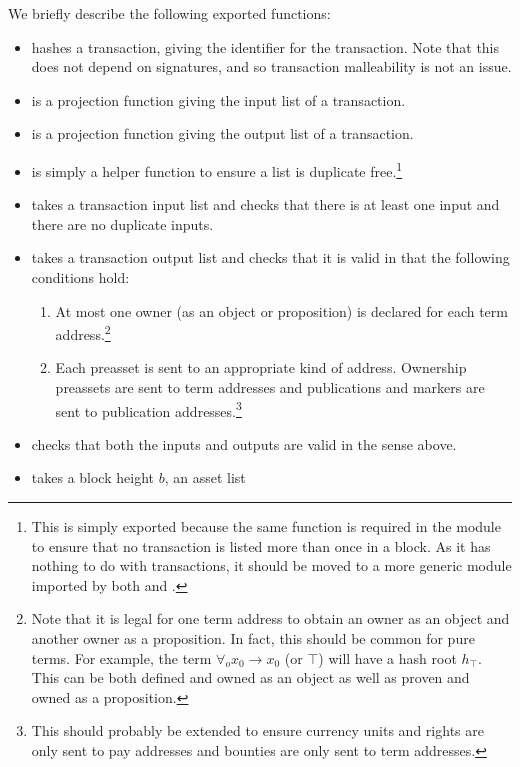 We briefly describe the following exported functions:
\begin{itemize}
\item {} hashes a transaction, giving the identifier for the transaction.
Note that this does not depend on signatures, and so transaction malleability is not an issue.
\item {} is a projection function giving the input list of a transaction.
\item {} is a projection function giving the output list of a transaction.
\item {} is simply a helper function to ensure a list is duplicate free.\footnote{This is simply exported because the same function is required in the {} module to ensure that no transaction is listed more than once in a block. As it has nothing to do with transactions, it should be moved to a more generic module imported by both {} and {}.}
\item {} takes a transaction input list
and checks that there is at least one input and there are no duplicate inputs.
\item {} takes a transaction output list
and checks that it is valid in that the following conditions hold:
\begin{enumerate}
\item At most one owner (as an object or proposition) is declared for each term address.\footnote{Note that it is legal for one term address to obtain an owner as an object and another owner as a proposition. In fact, this should be common for pure terms. For example, the term $\forall_o x_0\to x_0$ (or $\top$) will have
a hash root $h_\top$. This can be both defined and owned as an object as well as proven and owned as a proposition.}
\item Each preasset is sent to an appropriate kind of address.
Ownership preassets are sent to term addresses
and publications and markers are sent to publication addresses.\footnote{This should probably be extended to ensure currency units and rights are only sent to pay addresses and bounties are only sent to term addresses.}
\end{enumerate}
\item {} checks that both the inputs and outputs are valid in the sense above.
\item {} takes a block height $b$, an asset list

\end{itemize}
